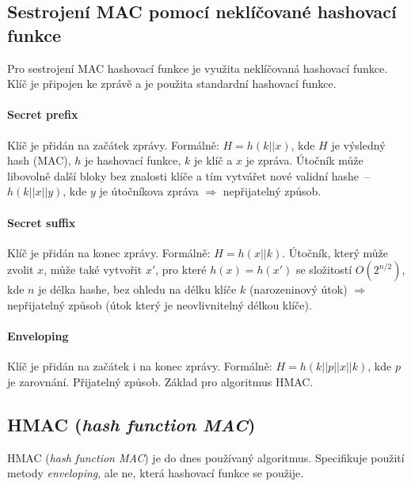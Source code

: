 \subsection*{Sestrojení MAC pomocí neklíčované hashovací funkce}

Pro sestrojení MAC hashovací funkce je využita neklíčovaná hashovací funkce. Klíč je připojen ke zprávě a je použita standardní hashovací funkce.

\paragraph*{Secret prefix} Klíč je přidán na začátek zprávy. Formálně: $H = h(k || x)$, kde $H$ je výsledný hash (MAC), $h$ je hashovací funkce, $k$ je klíč a $x$ je zpráva. Útočník může libovolně  další bloky bez znalosti klíče a tím vytvářet nové validní hashe~--~$h(k || x || y)$, kde $y$ je útočníkova zpráva $\Rightarrow$ nepřijatelný způsob.

\paragraph*{Secret suffix} Klíč je přidán na konec zprávy. Formálně: $H = h(x || k)$. Útočník, který může zvolit $x$, může také vytvořit $x'$, pro které $h(x) = h(x')$ se složitostí $O(2^{n/2})$, kde $n$ je délka hashe, bez ohledu na délku klíče $k$ (narozeninový útok) $\Rightarrow$ nepřijatelný způsob (útok který je neovlivnitelný délkou klíče).

\paragraph*{Enveloping} Klíč je přidán na začátek i na konec zprávy. Formálně: $H = h(k || p || x || k)$, kde $p$ je zarovnání. Přijatelný způsob. Základ pro algoritmus HMAC.

\subsection{HMAC (\textit{hash function MAC})}

HMAC (\textit{hash function MAC}) je do dnes používaný algoritmus. Specifikuje použití metody \textit{enveloping}, ale ne, která hashovací funkce se použije.

